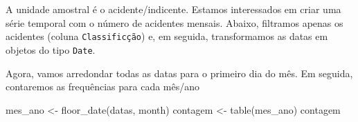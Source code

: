 \documentclass[
  letterpaper,
  DIV=11,
  numbers=noendperiod]{scrreprt}
\newenvironment{Shaded}{\begin{snugshade}}{\end{snugshade}}
\newcommand{\FunctionTok}[1]{\textcolor[rgb]{0.28,0.35,0.67}{#1}}
\newcommand{\NormalTok}[1]{\textcolor[rgb]{0.00,0.23,0.31}{#1}}
\newcommand{\OtherTok}[1]{\textcolor[rgb]{0.00,0.23,0.31}{#1}}
\newcommand{\SpecialCharTok}[1]{\textcolor[rgb]{0.37,0.37,0.37}{#1}}
\newcommand{\StringTok}[1]{\textcolor[rgb]{0.13,0.47,0.30}{#1}}
\begin{document}
A unidade amostral é o acidente/indicente. Estamos interessados em criar
uma série temporal com o número de acidentes mensais. Abaixo, filtramos
apenas os acidentes (coluna \texttt{Classificção}) e, em seguida,
transformamos as datas em objetos do tipo \texttt{Date}.

\begin{Shaded}
\end{Shaded}

Agora, vamos arredondar todas as datas para o primeiro dia do mês. Em
seguida, contaremos as frequências para cada mês/ano

\begin{Shaded}
\begin{Highlighting}[]
\NormalTok{mes\_ano }\OtherTok{\textless{}{-}} \FunctionTok{floor\_date}\NormalTok{(datas, }\StringTok{\textquotesingle{}month\textquotesingle{}}\NormalTok{)}
\NormalTok{contagem }\OtherTok{\textless{}{-}} \FunctionTok{table}\NormalTok{(mes\_ano)}
\NormalTok{contagem}
\end{Highlighting}
\end{Shaded}
\end{document}
